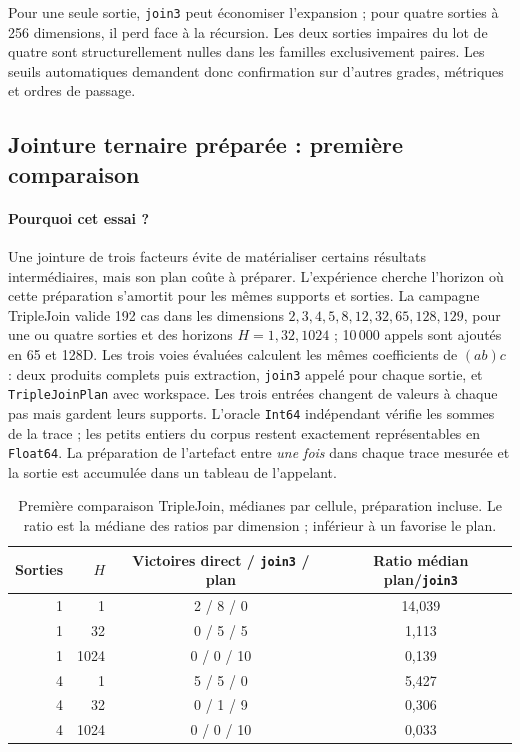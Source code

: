 \documentclass[11pt,a4paper]{article}
\newcommand{\code}[1]{\texttt{#1}}
\begin{document}
Pour une seule sortie, \code{join3} peut économiser l'expansion ; pour quatre
sorties à 256 dimensions, il perd face à la récursion. Les deux sorties
impaires du lot de quatre sont structurellement nulles dans les familles
exclusivement paires. Les seuils automatiques demandent donc confirmation sur
d'autres grades, métriques et ordres de passage.
\FloatBarrier

\subsection{Jointure ternaire préparée : première comparaison}
\label{sec:tripleperf}
\paragraph{Pourquoi cet essai ?}
Une jointure de trois facteurs évite de matérialiser certains résultats
intermédiaires, mais son plan coûte à préparer. L'expérience cherche
l'horizon où cette préparation s'amortit pour les mêmes supports et sorties.
La campagne TripleJoin valide 192 cas dans les dimensions
$2,3,4,5,8,12,32,65,128,129$, pour une ou quatre sorties et des horizons
$H=1,32,1024$ ; 10\,000 appels sont ajoutés en 65 et 128D. Les
trois voies évaluées calculent les mêmes coefficients de $(ab)c$ :
deux produits complets puis extraction, \code{join3} appelé pour chaque
sortie, et \code{TripleJoinPlan} avec workspace. Les trois entrées changent
de valeurs à chaque pas mais gardent leurs supports. L'oracle \code{Int64}
indépendant vérifie les sommes de la trace ; les petits entiers du corpus
restent exactement représentables en \code{Float64}. La préparation de
l'artefact entre \emph{une fois} dans chaque trace mesurée et la sortie
est accumulée dans un tableau de l'appelant.

\begin{table}[ht]
\centering\small
\begin{tabular}{@{}rrcc@{}}
\toprule
Sorties & $H$ & Victoires direct / \code{join3} / plan & Ratio médian plan/\code{join3} \\
\midrule
1 & 1 & 2 / 8 / 0 & 14,039 \\
1 & 32 & 0 / 5 / 5 & 1,113 \\
1 & 1024 & 0 / 0 / 10 & 0,139 \\
4 & 1 & 5 / 5 / 0 & 5,427 \\
4 & 32 & 0 / 1 / 9 & 0,306 \\
4 & 1024 & 0 / 0 / 10 & 0,033 \\
\bottomrule
\end{tabular}
\caption{Première comparaison TripleJoin, médianes par cellule, préparation incluse.
Le ratio est la médiane des ratios par dimension ; inférieur à un favorise
le plan.}
\label{tab:tripleperf}
\end{table}
\end{document}
